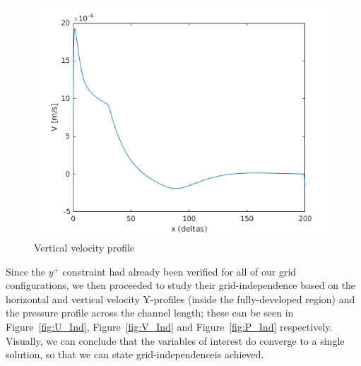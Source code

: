\documentclass[12pt]{article}
\begin{document}
        \begin{figure}[ht!]
                \centering
                \includegraphics[width=\textwidth]{V_Profile.png}
                \caption{Vertical velocity profile}
                \label{fig:V_Profile}
        \end{figure}

        Since the \( y^+ \) constraint had already been verified for all of our grid configurations, we then proceeded to study their grid-independence based on the horizontal and vertical velocity Y-profiles (inside the fully-developed region) and the pressure profile across the channel length; these can be seen in Figure~\ref{fig:U_Ind}, Figure~\ref{fig:V_Ind} and Figure~\ref{fig:P_Ind} respectively. Visually, we can conclude that the variables of interest do converge to a single solution, so that we can state grid-independenceis achieved.
\end{document}
